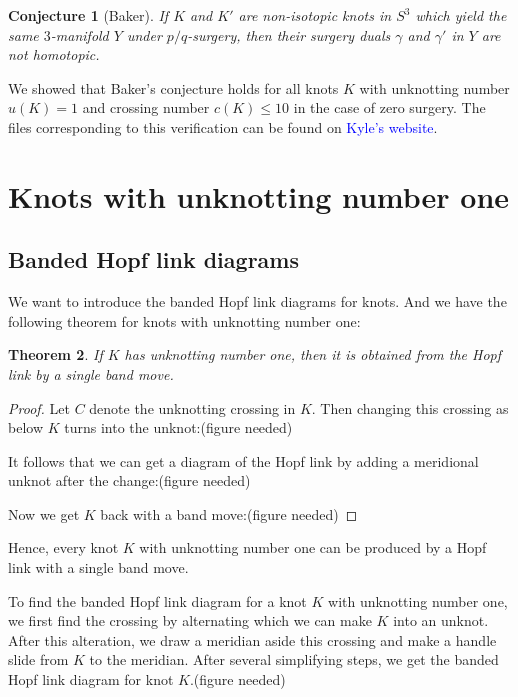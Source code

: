 \documentclass[11pt,usenames,dvipsnames,reqno]{amsart}
\newtheorem{theorem}{Theorem}
\numberwithin{theorem}{section}
\newtheorem{conjecture}[theorem]{Conjecture}
\theoremstyle{ex}
\theoremstyle{rem}
\def\kh#1{\textcolor{Blue}{#1}}
\begin{document}
\begin{conjecture}[Baker] If $K$ and $K'$ are non-isotopic knots in $S^3$ which yield the same $3$-manifold $Y$ under $p/q$-surgery, then their surgery duals $\gamma$ and $\gamma'$ in $Y$ are not homotopic.
\end{conjecture}

We showed that Baker's conjecture holds for all knots $K$ with unknotting number $u(K) = 1$ and crossing number $c(K) \leq 10$ in the case of zero surgery. The files corresponding to this verification can be found on \kh{Kyle's website}.


\section{Knots with unknotting number one}\label{sec:unknotting-one}


\subsection{Banded Hopf link diagrams} We want to introduce the banded Hopf link diagrams for knots. And we have the following theorem for knots with unknotting number one:

\begin {theorem} If $K$ has unknotting number one, then it is obtained from the Hopf link by a single band move.
\end{theorem}
\begin{proof} 
Let $C$ denote the unknotting crossing in $K$. Then changing this crossing as below $K$ turns into the unknot:(figure needed)

It follows that we can get a diagram of the Hopf link by adding a meridional unknot after the change:(figure needed)
 
Now we get $K$ back with a band move:(figure needed)
 
 \end{proof}

Hence, every knot $K$ with unknotting number one can be produced by a Hopf link with a single band move.

To find the banded Hopf link diagram for a knot $K$ with unknotting number one, we first find the crossing by alternating which we can make $K$ into an unknot. After this alteration, we draw a meridian aside this crossing and make a handle slide from $K$ to the meridian. After several simplifying steps, we get the banded Hopf link diagram for knot $K$.(figure needed)
\end{document}
